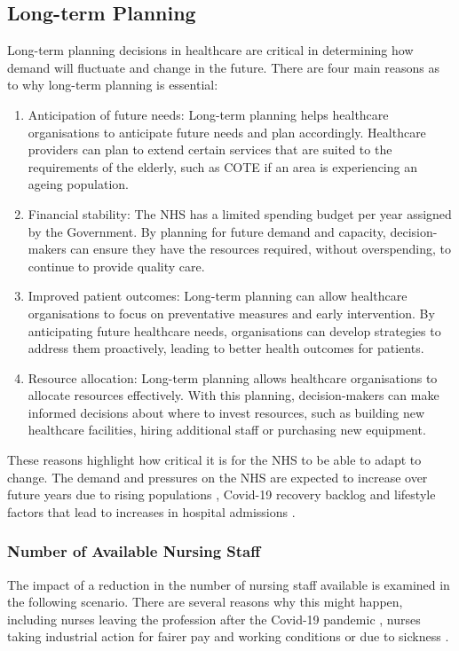 \documentclass[../thesis.tex]{subfiles}
\begin{document}
\subsection{Long-term Planning}\label{sec:scenario4}
Long-term planning decisions in healthcare are critical in determining how demand will fluctuate and change in the future. There are four main reasons as to why long-term planning is essential:
\begin{enumerate}
    \item Anticipation of future needs: Long-term planning helps healthcare organisations to anticipate future needs and plan accordingly. Healthcare providers can plan to extend certain services that are suited to the requirements of the elderly, such as COTE if an area is experiencing an ageing population.
    \item Financial stability: The NHS has a limited spending budget per year assigned by the Government. By planning for future demand and capacity, decision-makers can ensure they have the resources required, without overspending, to continue to provide quality care.
    \item Improved patient outcomes: Long-term planning can allow healthcare organisations to focus on preventative measures and early intervention. By anticipating future healthcare needs, organisations can develop strategies to address them proactively, leading to better health outcomes for patients.
    \item Resource allocation: Long-term planning allows healthcare organisations to allocate resources effectively. With this planning, decision-makers can make informed decisions about where to invest resources, such as building new healthcare facilities, hiring additional staff or purchasing new equipment.
\end{enumerate}

These reasons highlight how critical it is for the NHS to be able to adapt to change. The demand and pressures on the NHS are expected to increase over future years due to rising populations \cite{WelshGovernment2022b}, Covid-19 recovery backlog \cite{AGW2022} and lifestyle factors that lead to increases in hospital admissions \cite{Luben2019}. 

\subsubsection{Number of Available Nursing Staff}

The impact of a reduction in the number of nursing staff available is examined in the following scenario. There are several reasons why this might happen, including nurses leaving the profession after the Covid-19 pandemic \cite{Devereux2022}, nurses taking industrial action for fairer pay and working conditions \cite{RCN2023} or due to sickness \cite{WelshGovernment2022a}.
\end{document}
